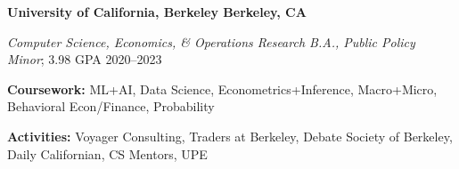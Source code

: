 \textbf{University of California, Berkeley \hfill Berkeley, CA} \par
\textit{Computer Science, Economics, \& Operations Research B.A., Public Policy Minor}; 3.98 GPA \hfill 2020--2023\par
\textbf{Coursework:} ML+AI, Data Science, Econometrics+Inference, Macro+Micro, Behavioral Econ/Finance, Probability\par
\textbf{Activities:} Voyager Consulting, Traders at Berkeley, Debate Society of Berkeley, Daily Californian, CS Mentors, UPE